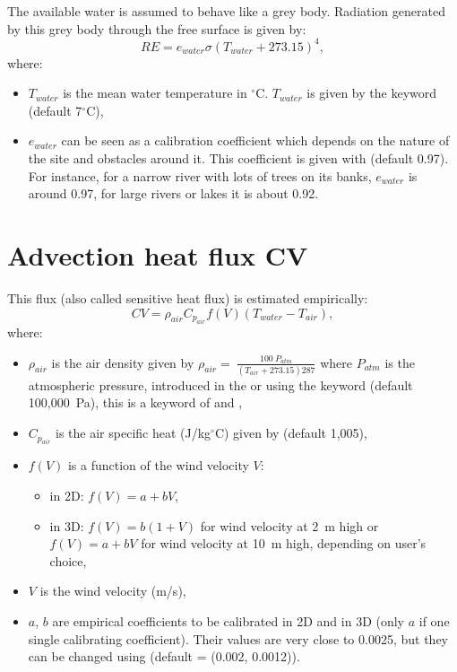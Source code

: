 The available water is assumed to behave like a grey body.
Radiation generated by this grey body through the free surface is given by:
\begin{equation*}
RE = e_{water}\sigma\left(T_{water}+273.15 \right)^4,
\end{equation*}
where:
\begin{itemize}
\item $T_{water}$ is the mean water temperature in ${}^\circ$C.
$T_{water}$ is given by the keyword  (default 7${}^\circ$C),
\item $e_{water}$ can be seen as a calibration coefficient which depends on the nature
of the site and obstacles around it.
This coefficient is given with
 (default 0.97).
For instance, for a narrow river with lots of trees on its banks,
$e_{water}$ is around 0.97, for large rivers or lakes it is about 0.92.
\end{itemize}


\section{Advection heat flux CV}

This flux (also called sensitive heat flux) is estimated empirically:
\begin{equation*}
CV=\rho_{air}C_{p_{air}}f(V)\left(T_{water}-T_{air} \right),
\end{equation*}
where:
\begin{itemize}
  \item $\rho_{air}$ is the air density given by
${\rho }_{air}=\ \frac{100\ P_{atm}}{\left(T_{air}+273.15\right)287}$
where $P_{atm}$ is the atmospheric pressure,
introduced in the  or using the keyword
 (default 100,000~Pa),
this is a keyword of  and ,
\item $C_{p_{air}}$ is the air specific heat (J/kg${}^\circ$C)
  given by  (default 1,005),
\item $f(V)$ is a function of the wind velocity $V$:
  \begin{itemize}
  \item in 2D: $f(V) = a+bV$,
  \item in 3D: $f(V) = b(1+V)$ for wind velocity at 2~m high
    or $f(V) = a+bV$ for wind velocity at 10~m high,
    depending on user's choice,
  \end{itemize}
\item $V$ is the wind velocity (m/s),
\item $a$, $b$ are empirical coefficients to be calibrated in 2D and in 3D (only $a$ if one single calibrating coefficient).
Their values are very close to 0.0025, but they can be changed
using  (default = (0.002, 0.0012)).
\end{itemize}

